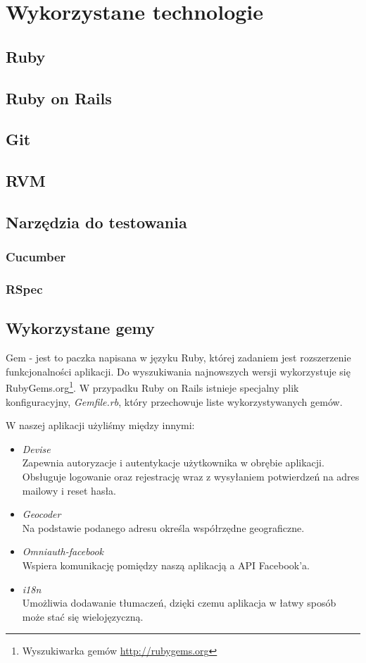 \section{Wykorzystane technologie}
  \subsection{Ruby}
  \subsection{Ruby on Rails}
  \subsection{Git}
  \subsection{RVM}
  \subsection{Narzędzia do testowania}
    \subsubsection{Cucumber}
    \subsubsection{RSpec}
  \subsection{Wykorzystane gemy}
    Gem - jest to paczka napisana w języku Ruby, której zadaniem jest rozszerzenie funkcjonalności aplikacji. Do wyszukiwania najnowszych wersji wykorzystuje się RubyGems.org\footnote{Wyszukiwarka gemów \url{http://rubygems.org}}. W przypadku Ruby on Rails istnieje specjalny plik konfiguracyjny, \emph{Gemfile.rb}, który przechowuje liste wykorzystywanych gemów.

    W naszej aplikacji użyliśmy między innymi:
    \begin{itemize}
      \item \emph{Devise} \\ Zapewnia autoryzacje i autentykacje użytkownika w obrębie aplikacji. Obsługuje logowanie oraz rejestrację wraz z wysyłaniem potwierdzeń na adres mailowy i reset hasła.
      \item \emph{Geocoder} \\ Na podstawie podanego adresu określa współrzędne geograficzne.
      \item \emph{Omniauth-facebook} \\ Wspiera komunikację pomiędzy naszą aplikacją a API Facebook'a.
      \item \emph{i18n} \\ Umożliwia dodawanie tłumaczeń, dzięki czemu aplikacja w łatwy sposób może stać się wielojęzyczną.
    \end{itemize}
